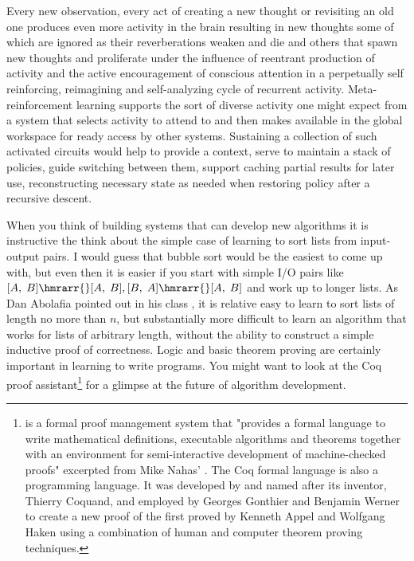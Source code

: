 Every new observation, every act of creating a new thought or revisiting an old one produces even more activity in the brain resulting in new thoughts some of which are ignored as their reverberations weaken and die and others that spawn new thoughts and proliferate under the influence of reentrant production of activity and the active encouragement of conscious attention in a perpetually self reinforcing, reimagining and self-analyzing cycle of recurrent activity. Meta-reinforcement learning supports the sort of diverse activity one might expect from a system that selects activity to attend to and then makes available in the global workspace for ready access by other systems. Sustaining a collection of such activated circuits would help to provide a context, serve to maintain a stack of policies, guide switching between them, support caching partial results for later use, reconstructing necessary state as needed when restoring policy after a recursive descent.

When you think of building systems that can develop new algorithms it is instructive the think about the simple case of learning to sort lists from input-output pairs. I would guess that bubble sort would be the easiest to come up with, but even then it is easier if you start with simple I/O pairs like $[A,\;B] \hmrarr{} [A,\;B], [B,\;A] \hmrarr{} [A,\;B]$ and work up to longer lists. As Dan Abolafia pointed out in his class {}, it is relative easy to learn to sort lists of length no more than $n$, but substantially more difficult to learn an algorithm that works for lists of arbitrary length, without the ability to construct a simple inductive proof of correctness. Logic and basic theorem proving are certainly important in learning to write programs. You might want to look at the Coq proof assistant\footnote{%
%
  {} is a formal proof management system that "provides a formal language to write mathematical definitions, executable algorithms and theorems together with an environment for semi-interactive development of machine-checked proofs" \emdash{} excerpted from Mike Nahas' {}. The Coq formal language is also a programming language. It was developed by and named after its inventor, Thierry Coquand, and employed by Georges Gonthier and Benjamin Werner to create a new proof of the {} first proved by Kenneth Appel and Wolfgang Haken using a combination of human and computer theorem proving techniques.} for a glimpse at the future of algorithm development.

